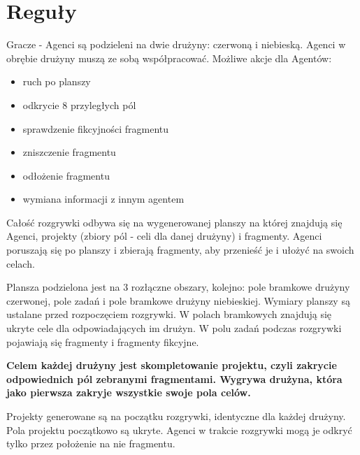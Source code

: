 \documentclass[Dokumentacja.tex]{subfiles}
\begin{document}
\section{Reguły}
Gracze - Agenci są podzieleni na dwie drużyny: czerwoną i niebieską. Agenci w obrębie drużyny muszą ze sobą współpracować. Możliwe akcje dla Agentów:
\begin{itemize}
	\item ruch po planszy
	\item odkrycie 8 przyległych pól
	\item sprawdzenie fikcyjności fragmentu
	\item zniszczenie fragmentu
	\item odłożenie fragmentu
	\item wymiana informacji z innym agentem
\end{itemize}

Całość rozgrywki odbywa się na wygenerowanej planszy na której znajdują się Agenci, projekty (zbiory pól - celi dla danej drużyny) i fragmenty.  Agenci poruszają się po planszy i zbierają fragmenty, aby przenieść je i ułożyć na swoich celach.

Plansza podzielona jest na 3 rozłączne obszary, kolejno: pole bramkowe drużyny czerwonej, pole zadań i pole bramkowe drużyny niebieskiej. Wymiary planszy są ustalane przed rozpoczęciem rozgrywki. W polach bramkowych znajdują się ukryte cele dla odpowiadających im drużyn. W polu zadań podczas rozgrywki pojawiają się fragmenty i fragmenty fikcyjne.

\textbf{Celem każdej drużyny jest skompletowanie projektu, czyli zakrycie odpowiednich pól zebranymi fragmentami. Wygrywa drużyna, która jako pierwsza zakryje wszystkie swoje pola celów.}

Projekty generowane są na początku rozgrywki, identyczne dla każdej drużyny. Pola projektu początkowo są ukryte. Agenci w trakcie rozgrywki mogą je odkryć tylko przez położenie na nie fragmentu.

\end{document}

